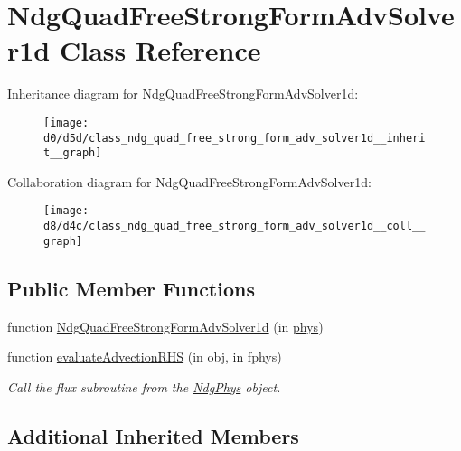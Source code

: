 \hypertarget{class_ndg_quad_free_strong_form_adv_solver1d}{}\section{Ndg\+Quad\+Free\+Strong\+Form\+Adv\+Solver1d Class Reference}
\label{class_ndg_quad_free_strong_form_adv_solver1d}


Inheritance diagram for Ndg\+Quad\+Free\+Strong\+Form\+Adv\+Solver1d\+:
\nopagebreak
\begin{figure}[H]
\begin{center}
\leavevmode
\texttt{[image: d0/d5d/class\_ndg\_quad\_free\_strong\_form\_adv\_solver1d\_\_inherit\_\_graph]}
\end{center}
\end{figure}


Collaboration diagram for Ndg\+Quad\+Free\+Strong\+Form\+Adv\+Solver1d\+:
\nopagebreak
\begin{figure}[H]
\begin{center}
\leavevmode
\texttt{[image: d8/d4c/class\_ndg\_quad\_free\_strong\_form\_adv\_solver1d\_\_coll\_\_graph]}
\end{center}
\end{figure}
\subsection*{Public Member Functions}
\begin{DoxyCompactItemize}
\item 
function \hyperlink{class_ndg_quad_free_strong_form_adv_solver1d_acd91b9f8f0150efdeb74aa24804f9a60}{Ndg\+Quad\+Free\+Strong\+Form\+Adv\+Solver1d} (in \hyperlink{class_ndg_abstract_adv_solver_aef07c3e090321fa7a09d8120f74f5964}{phys})
\item 
function \hyperlink{class_ndg_quad_free_strong_form_adv_solver1d_a0805fc0f50c48cf49517204fbc440118}{evaluate\+Advection\+R\+HS} (in obj, in fphys)
\begin{DoxyCompactList}\small\item\em Call the flux subroutine from the \hyperlink{class_ndg_phys}{Ndg\+Phys} object. \end{DoxyCompactList}\end{DoxyCompactItemize}
\subsection*{Additional Inherited Members}


